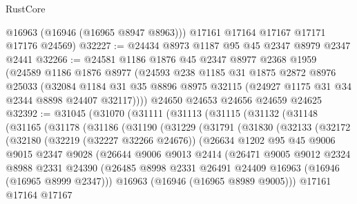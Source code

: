 \begin{lexlean}{RustCore}
\begin{coremodule}
        @16963
        (@16946 (@16965 @8947 @8963)))
      @17161
      @17164
      @17167
      @17171
      @17176
      @24569)
@32227 := @24434 @8973 @1187 @95 @45 @2347 @8979 @2347 @2441
@32266 := @24581
    @1186
    @1876
    @45
    @2347
    @8977
    @2368
    @1959
    (@24589
      @1186
      @1876
      @8977
      (@24593
        @238
        @1185
        @31
        @1875
        @2872
        @8976
        @25033
        (@32084 @1184 @31 @35 @8896 @8975 @32115 (@24927 @1175 @31 @34 @2344 @8898 @24407 @32117))))
    @24650
    @24653
    @24656
    @24659
    @24625
@32392 := @31045
    (@31070
      (@31111
        (@31113
          (@31115
            (@31132
              (@31148
                (@31165
                  (@31178
                    (@31186
                      (@31190
                        (@31229
                          (@31791
                            (@31830
                              (@32133
                                (@32172
                                  (@32180
                                    (@32219 (@32227 @32266 @24676))
                                    (@26634
                                      @1202
                                      @95
                                      @45
                                      @9006
                                      @9015
                                      @2347
                                      @9028
                                      (@26644
                                        @9006
                                        @9013
                                        @2414
                                        (@26471
                                          @9005
                                          @9012
                                          @2324
                                          @8988
                                          @2331
                                          @24390
                                          (@26485
                                            @8998
                                            @2331
                                            @26491
                                            @24409
                                            @16963
                                            (@16946 (@16965 @8999 @2347)))
                                          @16963
                                          (@16946 (@16965 @8989 @9005)))
                                        @17161
                                        @17164
                                        @17167

\end{coremodule}
\end{lexlean}
